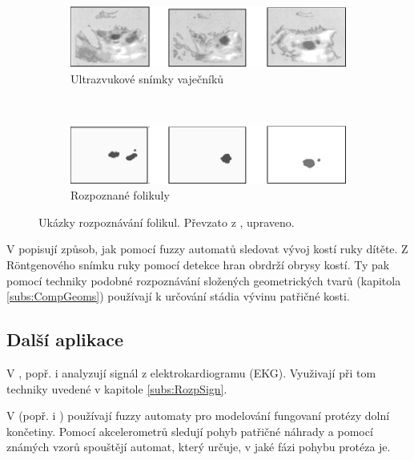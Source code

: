 \begin{figure}
  \begin{subfigure}[t]{\textwidth}
    \includegraphics[width=\textwidth]{genimg-follicles-1}
    \caption{Ultrazvukové snímky vaječníků} \label{img:Follicles:Screens}
  \end{subfigure}
  \\
  \begin{subfigure}[t]{\textwidth}
    \includegraphics[width=\textwidth]{genimg-follicles-2}
    \caption{Rozpoznané folikuly}
  \end{subfigure}
 
  \caption[Ukázky rozpoznávání folikul]{Ukázky rozpoznávání folikul. Převzato z \cite{WanJiaZhoDu-ImProcBasFuzCelAuMod}, upraveno.} \label{img:Follicles}
\end{figure}

V \cite{PatPal-FuzGraSynRecSkeMatXra} popisují způsob, jak pomocí fuzzy automatů sledovat vývoj kostí ruky dítěte. Z R\"{o}ntgenového snímku ruky pomocí detekce hran obrdrží obrysy kostí. Ty pak pomocí techniky podobné rozpoznávání složených geometrických tvarů (kapitola \ref{subs:CompGeoms}) používají k určování stádia vývinu patřičné kosti.

\subsection{Další aplikace} \label{subs:BioMedRest}
V \cite{PedGac-LeaFuzzAut}, popř. i \cite{RigTza-FuzAutFauDia} analyzují signál z elektrokardiogramu (EKG). Využivají při tom techniky uvedené v kapitole \ref{subs:RozpSign}.

V \cite{Alv-HumGaiModUsGenFuzFinStaMac} (popř. i \cite{AlvTri-ComModQuaPerSig})
používají fuzzy automaty pro modelování fungovaní protézy dolní končetiny. Pomocí akcelerometrů sledují pohyb patřičné náhrady a pomocí známých vzorů spouštějí automat, který určuje, v jaké fázi pohybu protéza je.

